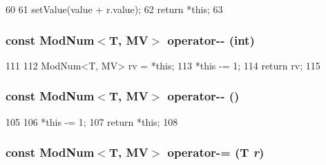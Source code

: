 \begin{DoxyCode}
60                                                     {
61         setValue(value + r.value);
62         return *this;
63     }
\end{DoxyCode}
\hypertarget{classModNum_a768eff646e5c38f101a9b90532048964}{
\subsubsection[{operator-\/-\/}]{\setlength{\rightskip}{0pt plus 5cm}const {\bf ModNum}$<$T, MV$>$ operator-\/-\/ (int)}}
\label{classModNum_a768eff646e5c38f101a9b90532048964}



\begin{DoxyCode}
111                                         {
112         ModNum<T, MV> rv = *this;
113         *this -= 1;
114         return rv;
115     }
\end{DoxyCode}
\hypertarget{classModNum_ae86d1c5506399fd33b8dc9de5b6481ab}{
\subsubsection[{operator-\/-\/}]{\setlength{\rightskip}{0pt plus 5cm}const {\bf ModNum}$<$T, MV$>$ operator-\/-\/ ()}}
\label{classModNum_ae86d1c5506399fd33b8dc9de5b6481ab}



\begin{DoxyCode}
105                                      {
106         *this -= 1;
107         return *this;
108     }
\end{DoxyCode}
\hypertarget{classModNum_ac7d636a5f72a15f680d7ecc93a8848b3}{
\subsubsection[{operator-\/=}]{\setlength{\rightskip}{0pt plus 5cm}const {\bf ModNum}$<$T, MV$>$ operator-\/= (T {\em r})}}
\label{classModNum_ac7d636a5f72a15f680d7ecc93a8848b3}




